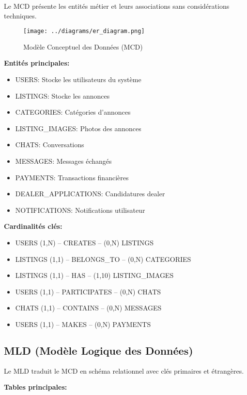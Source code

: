 Le MCD présente les entités métier et leurs associations sans considérations techniques.

\begin{figure}[H]
\centering
\texttt{[image: ../diagrams/er\_diagram.png]}
\caption{Modèle Conceptuel des Données (MCD)}
\label{fig:mcd}
\end{figure}

\textbf{Entités principales:}
\begin{itemize}
    \item USERS: Stocke les utilisateurs du système
    \item LISTINGS: Stocke les annonces
    \item CATEGORIES: Catégories d'annonces
    \item LISTING\_IMAGES: Photos des annonces
    \item CHATS: Conversations
    \item MESSAGES: Messages échangés
    \item PAYMENTS: Transactions financières
    \item DEALER\_APPLICATIONS: Candidatures dealer
    \item NOTIFICATIONS: Notifications utilisateur
\end{itemize}

\textbf{Cardinalités clés:}
\begin{itemize}
    \item USERS (1,N) -- CREATES -- (0,N) LISTINGS
    \item LISTINGS (1,1) -- BELONGS\_TO -- (0,N) CATEGORIES
    \item LISTINGS (1,1) -- HAS -- (1,10) LISTING\_IMAGES
    \item USERS (1,1) -- PARTICIPATES -- (0,N) CHATS
    \item CHATS (1,1) -- CONTAINS -- (0,N) MESSAGES
    \item USERS (1,1) -- MAKES -- (0,N) PAYMENTS
\end{itemize}

\subsection{MLD (Modèle Logique des Données)}

Le MLD traduit le MCD en schéma relationnel avec clés primaires et étrangères.

\textbf{Tables principales:}

